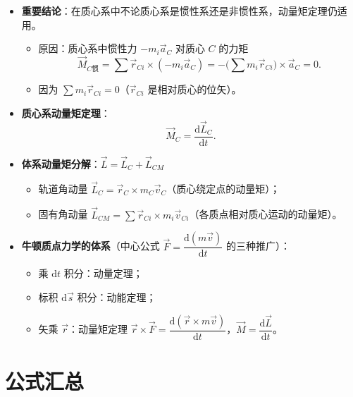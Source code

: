 \documentclass[12pt,a4paper]{ctexart}
\begin{document}
\begin{itemize}
    \item \textbf{重要结论}：在质心系中不论质心系是惯性系还是非惯性系，动量矩定理仍适用。
    \begin{itemize}
        \item 原因：质心系中惯性力 $-m_i\vec{a}_C$ 对质心 $C$ 的力矩
        \[
            \vec{M}_{C\text{惯}} = \sum \vec{r}_{Ci}\times(-m_i\vec{a}_C) = -\biggl(\sum m_i\vec{r}_{Ci}\biggr)\times\vec{a}_C = 0.
        \]
        \item 因为 $\sum m_i\vec{r}_{Ci} = 0$（$\vec{r}_{Ci}$ 是相对质心的位矢）。
    \end{itemize}
    \item \textbf{质心系动量矩定理}：
    \[
        \vec{M}_C = \frac{\mathrm{d}\vec{L}_C}{\mathrm{d}t}.
    \]
    \item \textbf{体系动量矩分解}：$\vec{L} = \vec{L}_C + \vec{L}_{CM}$
    \begin{itemize}
        \item 轨道角动量 $\vec{L}_C = \vec{r}_C \times m_C\vec{v}_C$（质心绕定点的动量矩）；
        \item 固有角动量 $\vec{L}_{CM} = \sum \vec{r}_{Ci}\times m_i\vec{v}_{Ci}$（各质点相对质心运动的动量矩）。
    \end{itemize}
    \item \textbf{牛顿质点力学的体系}（中心公式 $\vec{F} = \dfrac{\mathrm{d}(m\vec{v})}{\mathrm{d}t}$ 的三种推广）：
    \begin{itemize}
        \item 乘 $\mathrm{d}t$ 积分：动量定理；
        \item 标积 $\mathrm{d}\vec{s}$ 积分：动能定理；
        \item 矢乘 $\vec{r}$：动量矩定理 $\vec{r}\times\vec{F} = \dfrac{\mathrm{d}(\vec{r}\times m\vec{v})}{\mathrm{d}t}$，$\vec{M} = \dfrac{\mathrm{d}\vec{L}}{\mathrm{d}t}$。
    \end{itemize}
\end{itemize}

\section{公式汇总}
\end{document}
